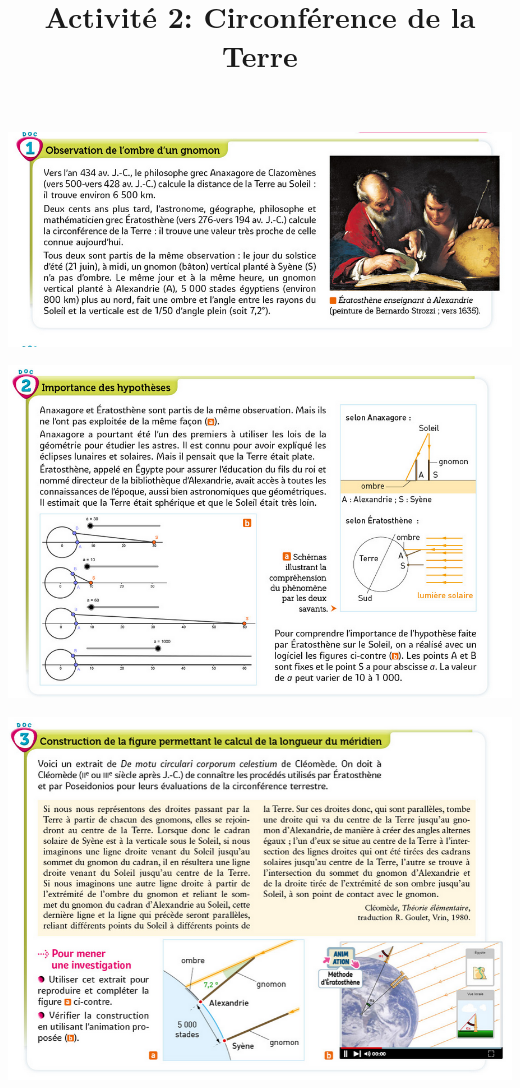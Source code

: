 \documentclass[10pt]{article}
\newcommand{\titreActivite}{Activité 2: Circonférence de la Terre} %
\newcommand{\myscale}{0.57}
\begin{document}
\date{}
\title{\titreActivite}
\maketitle %


\begin{center}
	\includegraphics[scale=\myscale]{assets/d1.png}

	\includegraphics[scale=\myscale]{assets/d2.png}

	\includegraphics[scale=\myscale]{assets/d3.png}


\end{center}
\end{document}
